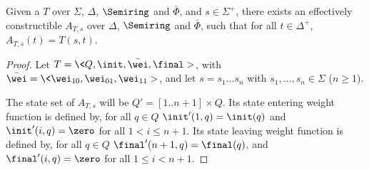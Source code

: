 
\begin{proposition} \label{prop:epsilon}
Given a \SWT $T$ over $\Sigma$, $\Delta$, $\Semiring$ and $\bar\Phi$,
and $s \in \Sigma^+$, 
there exists an effectively constructible \SWA 
$A_{T, s}$ over $\Delta$, $\Semiring$ and $\bar\Phi$,
such that for all $t \in \Delta^+$, $A_{T, s}(t) = T(s, t)$.
\end{proposition}
%
\begin{proof}
Let $T = \< Q, \init, \bar{\wei}, \final >$,
with $\bar{\wei} = \< \wei_{10}, \wei_{01}, \wei_{11}>$,
and let $s = s_1 \ldots s_n$ with $s_1, \ldots, s_n \in \Sigma$ ($n \geq 1$). %

The state set of $A_{T, s}$ will be $Q' = [1..n+1] \times Q$.
Its state entering weight function is defined by, 
for all $q \in Q$ $\init'(1, q) = \init(q)$ 
and $\init'(i, q) = \zero$ for all $1 < i \leq n+1$. 
Its state leaving weight function is defined by, for all $q \in Q$ 
$\final'(n+1, q) = \final(q)$, 
and $\final'(i, q) = \zero$ for all $1 \leq i <  n+1$.


\end{proof}
